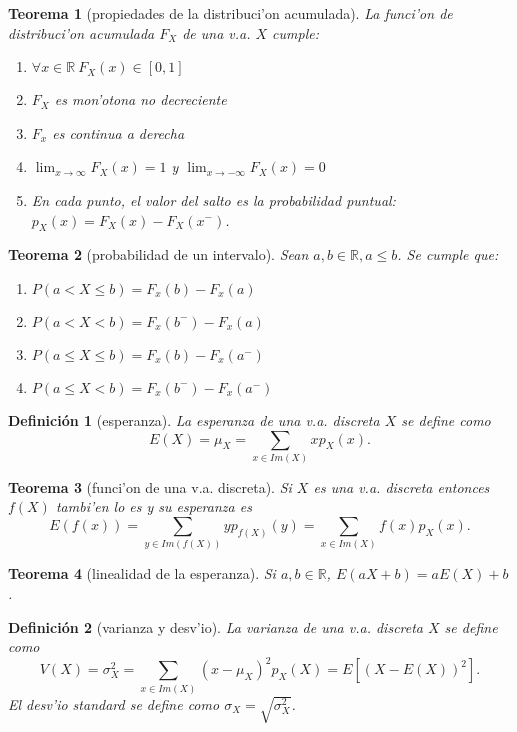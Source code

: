 \documentclass[a4paper,spanish]{article}
\newcommand{\R}[0]{\mathbb{R}}
\newcommand{\limite}[2]{\lim_{ #1 \rightarrow #2}}
\newtheorem{teo}{Teorema}
\newtheorem{defi}{Definici\'on}
\begin{document}
\begin{teo}[propiedades de la distribuci'on acumulada]
La funci'on de distribuci'on acumulada $F_X$ de una v.a. $X$ cumple:
\begin{enumerate}
\item $\forall x \in \R\ F_X(x) \in [0,1]$
\item $F_X$ es mon'otona no decreciente
\item $F_x$ es continua a derecha
\item $\limite{x}{\infty} F_X(x) = 1$ y $\limite{x}{-\infty} F_X(x) = 0$
\item En cada punto, el valor del salto es la probabilidad puntual: 
	$p_X(x) = F_X(x) - F_X(x^-)$.
\end{enumerate}
\end{teo}

\begin{teo}[probabilidad de un intervalo]
Sean $a,b \in \R, a \leq b$. Se cumple que:
\begin{enumerate}
\item $P(a < X \leq b) = F_x(b) - F_x(a)$
\item $P(a < X < b) = F_x(b^-) - F_x(a)$
\item $P(a \leq X \leq b) = F_x(b) - F_x(a^-)$
\item $P(a \leq X < b) = F_x(b^-) - F_x(a^-)$
\end{enumerate}
\end{teo}

\begin{defi}[esperanza]
La \emph{esperanza} de una v.a. discreta $X$ se define como 
$$E(X) = \mu_X = \sum_{x \in Im(X)} x p_X(x).$$
\end{defi}

\begin{teo}[funci'on de una v.a. discreta]
Si $X$ es una v.a. discreta entonces $f(X)$ tambi'en lo es y su esperanza es
$$E(f(x)) = \sum_{y \in Im(f(X))} y p_{f(X)}(y) = 
	\sum_{x \in Im(X)} f(x) p_X(x).$$
\end{teo}

\begin{teo}[linealidad de la esperanza]
Si $a,b \in \R$, $E(aX+b) = aE(X)+b$.
\end{teo}

\begin{defi}[varianza y desv'io]
La \emph{varianza} de una v.a. discreta $X$ se define como
$$V(X) = \sigma^2_X = \sum_{x \in Im(X)} (x - \mu_X)^2 p_X(X) = 
	E[(X-E(X))^2].$$
El \emph{desv'io standard} se define como $\sigma_X = \sqrt{\sigma^2_X}$.
\end{defi}
\end{document}
